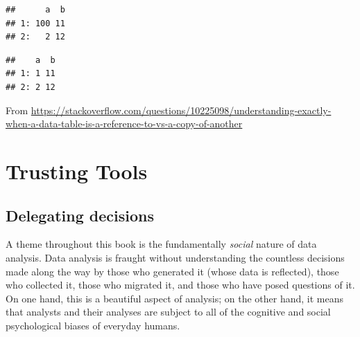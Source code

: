 \documentclass[
]{krantz}
\makeatletter
\newenvironment{Shaded}{\begin{snugshade}}{\end{snugshade}}
\newcommand{\AttributeTok}[1]{\textcolor[rgb]{0.61,0.61,0.61}{#1}}
\newcommand{\CommentTok}[1]{\textcolor[rgb]{0.37,0.37,0.37}{\textit{#1}}}
\newcommand{\DecValTok}[1]{\textcolor[rgb]{0.06,0.06,0.06}{#1}}
\newcommand{\ErrorTok}[1]{\textcolor[rgb]{0.14,0.14,0.14}{\textbf{#1}}}
\newcommand{\FunctionTok}[1]{\textcolor[rgb]{0,0,0}{#1}}
\newcommand{\NormalTok}[1]{#1}
\newcommand{\OtherTok}[1]{\textcolor[rgb]{0.37,0.37,0.37}{#1}}
\newcommand{\SpecialCharTok}[1]{\textcolor[rgb]{0,0,0}{#1}}
\newenvironment{kframe}{%
\medskip{}
\setlength{\fboxsep}{.8em}
 \def\at@end@of@kframe{}%
 \ifinner\ifhmode%
  \def\at@end@of@kframe{\end{minipage}}%
  \begin{minipage}{\columnwidth}%
 \fi\fi%
 \def\FrameCommand##1{\hskip\@totalleftmargin \hskip-\fboxsep
 \colorbox{shadecolor}{##1}\hskip-\fboxsep
     \hskip-\linewidth \hskip-\@totalleftmargin \hskip\columnwidth}%
 \MakeFramed {\advance\hsize-\width
   \@totalleftmargin\z@ \linewidth\hsize
   \@setminipage}}%
 {\par\unskip\endMakeFramed%
 \at@end@of@kframe}
\renewenvironment{Shaded}{\begin{kframe}}{\end{kframe}}
\makeatother
\begin{document}
\begin{verbatim}
##      a  b
## 1: 100 11
## 2:   2 12
\end{verbatim}

\begin{Shaded}
\end{Shaded}

\begin{verbatim}
##    a  b
## 1: 1 11
## 2: 2 12
\end{verbatim}

From \url{https://stackoverflow.com/questions/10225098/understanding-exactly-when-a-data-table-is-a-reference-to-vs-a-copy-of-another}

\hypertarget{trusting-tools}{%
\section{Trusting Tools}\label{trusting-tools}}

\hypertarget{delegating-decisions}{%
\subsection{Delegating decisions}\label{delegating-decisions}}

A theme throughout this book is the fundamentally \emph{social} nature of data analysis. Data analysis is fraught without understanding the countless decisions made along the way by those who generated it (whose data is reflected), those who collected it, those who migrated it, and those who have posed questions of it. On one hand, this is a beautiful aspect of analysis; on the other hand, it means that analysts and their analyses are subject to all of the cognitive and social psychological biases of everyday humans.
\end{document}
